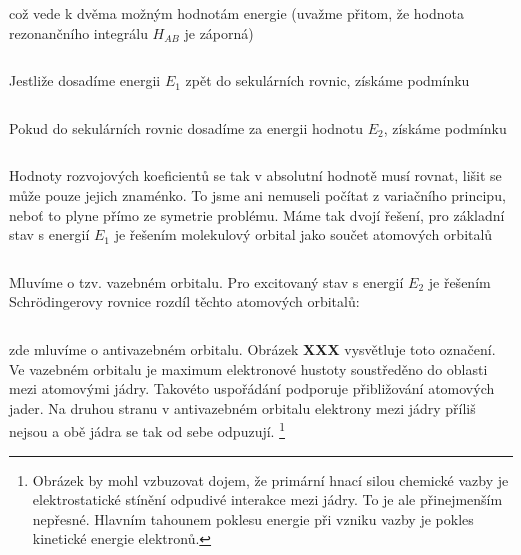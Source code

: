 \begin{equation}
\label{rov:XXX}
\end{equation}

\noindent což vede k dvěma možným hodnotám energie (uvažme přitom, že hodnota rezonančního integrálu $H_{AB}$ je záporná)


\begin{equation}
\label{rov:XXX}
\end{equation}

Jestliže dosadíme energii $E_1$ zpět do sekulárních rovnic, získáme podmínku 

\begin{equation}
\label{rov:XXX}
\end{equation}

Pokud do sekulárních rovnic  dosadíme za energii hodnotu $E_2$, získáme podmínku

\begin{equation}
\label{rov:XXX}
\end{equation}

\noindent Hodnoty rozvojových koeficientů se tak v absolutní hodnotě musí rovnat, lišit se může pouze jejich znaménko. To jsme ani nemuseli počítat z variačního principu, neboť to plyne přímo ze symetrie problému. Máme tak dvojí řešení, pro základní stav s energií $E_1$ je řešením molekulový orbital jako součet atomových orbitalů

\begin{equation}
\label{rov:XXX}
\end{equation}

\noindent Mluvíme o tzv. vazebném orbitalu. Pro excitovaný stav s energií $E_2$ je řešením Schr\"odingerovy rovnice rozdíl těchto atomových orbitalů:

\begin{equation}
\label{rov:XXX}
\end{equation}

\noindent zde mluvíme o antivazebném orbitalu. Obrázek \textbf{XXX} vysvětluje toto označení. Ve vazebném orbitalu je maximum elektronové hustoty soustředěno do oblasti mezi atomovými jádry. Takovéto uspořádání podporuje přibližování atomových jader. Na druhou stranu v antivazebném orbitalu elektrony mezi jádry příliš nejsou a obě jádra se tak od sebe odpuzují. \footnote{Obrázek by mohl vzbuzovat dojem, že primární hnací silou chemické vazby je elektrostatické stínění odpudivé interakce mezi jádry. To je ale přinejmenším nepřesné. Hlavním tahounem poklesu energie při vzniku vazby je pokles kinetické energie elektronů.} 


